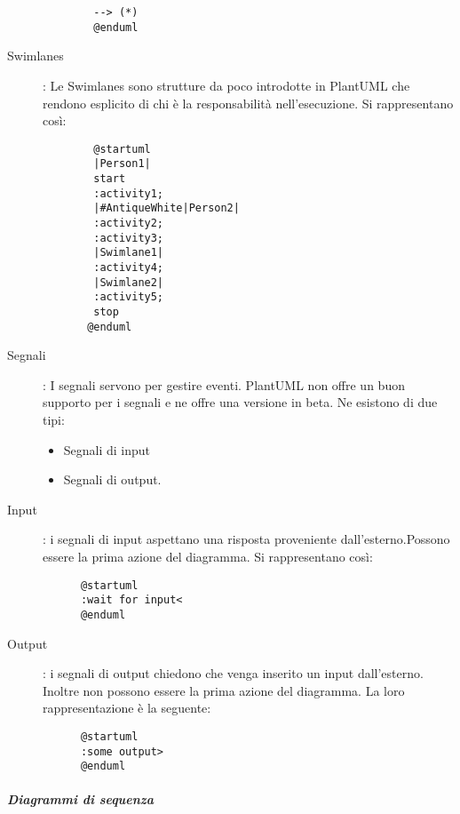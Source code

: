 \documentclass[../../norme-di-progetto.tex]{subfiles}
\begin{document}
\begin{description}
\begin{center}
\begin{verbatim}
        --> (*)
        @enduml
      \end{verbatim}
    \end{center}
    \item[Swimlanes]: Le Swimlanes sono strutture da poco introdotte in PlantUML che rendono esplicito di chi è la responsabilità nell'esecuzione. Si rappresentano così:
    \begin{center}
      \begin{verbatim}
        @startuml
        |Person1|
        start
        :activity1;
        |#AntiqueWhite|Person2|
        :activity2;
        :activity3;
        |Swimlane1|
        :activity4;
        |Swimlane2|
        :activity5;
        stop
       @enduml
     \end{verbatim}
   \end{center}
   \item[Segnali]: I segnali servono per gestire eventi. PlantUML non offre un buon supporto per i segnali e ne offre una versione in beta. Ne esistono di due tipi:
   \begin{itemize}
    \item Segnali di input
    \item Segnali di output.
   \end{itemize}
   \item [Input]: i segnali di input aspettano una risposta proveniente dall'esterno.Possono essere la prima azione del diagramma. Si rappresentano così:
   \begin{center}
    \begin{verbatim}
      @startuml
      :wait for input<
      @enduml
    \end{verbatim}
   \end{center}
   \item [Output]: i segnali di output chiedono che venga inserito un input dall'esterno. Inoltre non possono essere la prima azione del diagramma. La loro rappresentazione è la seguente:
   \begin{center}
    \begin{verbatim}
      @startuml
      :some output>
      @enduml
    \end{verbatim}
   \end{center}
\end{description}
\subparagraph{Diagrammi di sequenza}%
\label{subp:diagrammi_di_sequenza}
\end{document}
